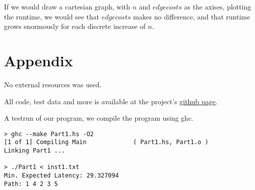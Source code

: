 \documentclass[a4paper,11pt]{article}
\begin{document}
If we would draw a cartesian graph, with $n$ and $edgecosts$ as the axises, plotting the runtime,
we would see that $edgecosts$ makes no difference, and that runtime grows enormously for each
discrete increase of $n$.

\section{Appendix}
No external resources was used.

All code, test data and more is available at the project's \href{https://github.com/bisforboman/Algorithms-TIN092}{github page}.

A testrun of our program, we compile the program using ghc.

\begin{lstlisting}
> ghc --make Part1.hs -O2
[1 of 1] Compiling Main             ( Part1.hs, Part1.o )
Linking Part1 ...

> ./Part1 < inst1.txt 
Min. Expected Latency: 29.327094
Path: 1 4 2 3 5

\end{lstlisting}
\end{document}
